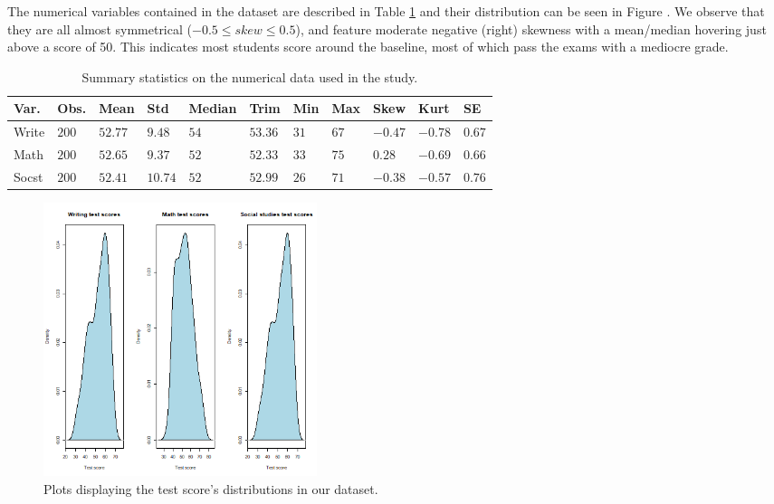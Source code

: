 \documentclass[10pt, a4paper]{article}
\begin{document}
	The numerical variables contained in the dataset are described in Table \ref{tab::summary_stats} and their distribution can be seen in Figure . We observe that they are all almost symmetrical ($-0.5 \leq skew \leq 0.5$), and feature moderate negative (right) skewness with a mean/median hovering just above a score of 50. This indicates most students score around the baseline, most of which pass the exams with a mediocre grade.
	
	\begin{table}
		\centering
		\begin{tabular}
			{ |p{1cm} p{0.5cm} p{0.7cm} p{0.5cm} p{1cm} p{0.7cm} p{0.5cm} p{0.5cm} p{0.5cm} p{0.5cm} p{0.5cm}| }
			\hline
			\textbf{Var.} & \textbf{Obs.} & \textbf{Mean} & \textbf{Std} & \textbf{Median} & \textbf{Trim} & \textbf{Min} & \textbf{Max} & \textbf{Skew} & \textbf{Kurt} & \textbf{SE}\\
			\hline
			Write & $200$ & $52.77$ & $9.48$ & $54$ & $53.36$ & $31$ & $67$ & $-0.47$ & $-0.78$ & $0.67$ \\
			Math & $200$ & $52.65$ & $9.37$ & $52$ & $52.33$ & $33$ & $75$ & $0.28$ & $-0.69$ & $0.66$ \\
			Socst & $200$ & $52.41$ & $10.74$ & $52$ &$ 52.99$ & $26$ & $71$ & $-0.38$ & $-0.57$ & $0.76$ \\
			\hline
		\end{tabular}
		\caption{Summary statistics on the numerical data used in the study.}
		\label{tab::summary_stats}
	\end{table}

	\begin{figure}
		\includegraphics[width=8cm]{density_plots.png}
		\centering
		\caption{Plots displaying the test score's distributions in our dataset.}
		\label{fig::test_distribution}
	\end{figure}
		
\end{document}
